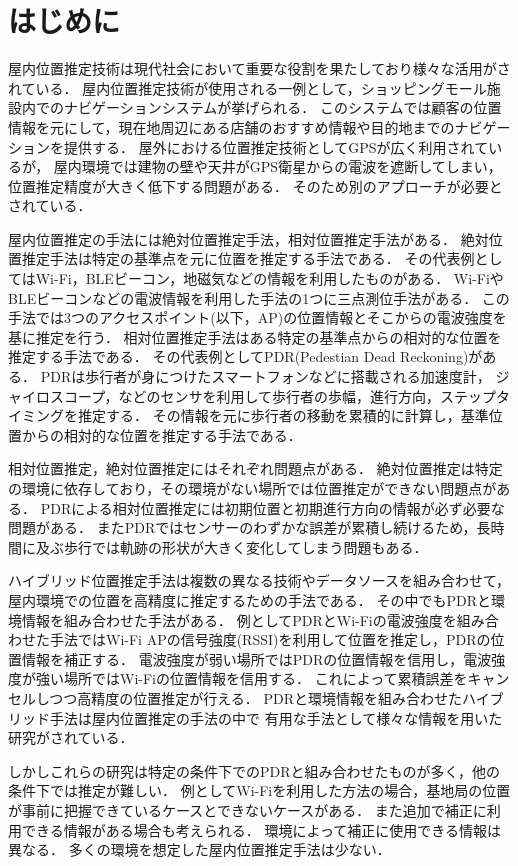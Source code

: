 
\section{はじめに}
屋内位置推定技術は現代社会において重要な役割を果たしており様々な活用がされている．
屋内位置推定技術が使用される一例として，ショッピングモール施設内でのナビゲーションシステムが挙げられる\cite{burasapo}．
このシステムでは顧客の位置情報を元にして，現在地周辺にある店舗のおすすめ情報や目的地までのナビゲーションを提供する．
屋外における位置推定技術としてGPSが広く利用されているが，
屋内環境では建物の壁や天井がGPS衛星からの電波を遮断してしまい，
位置推定精度が大きく低下する問題がある．
そのため別のアプローチが必要とされている．

屋内位置推定の手法には絶対位置推定手法，相対位置推定手法がある．
絶対位置推定手法は特定の基準点を元に位置を推定する手法である．
その代表例としてはWi-Fi，BLEビーコン，地磁気などの情報を利用したものがある．
Wi-FiやBLEビーコンなどの電波情報を利用した手法の1つに三点測位手法がある．
この手法では3つのアクセスポイント(以下，AP)の位置情報とそこからの電波強度を基に推定を行う．
相対位置推定手法はある特定の基準点からの相対的な位置を推定する手法である．
その代表例としてPDR(Pedestian Dead Reckoning)がある．
PDRは歩行者が身につけたスマートフォンなどに搭載される加速度計，
ジャイロスコープ，などのセンサを利用して歩行者の歩幅，進行方向，ステップタイミングを推定する．
その情報を元に歩行者の移動を累積的に計算し，基準位置からの相対的な位置を推定する手法である．

相対位置推定，絶対位置推定にはそれぞれ問題点がある．
絶対位置推定は特定の環境に依存しており，その環境がない場所では位置推定ができない問題点がある．
PDRによる相対位置推定には初期位置と初期進行方向の情報が必ず必要な問題がある．
またPDRではセンサーのわずかな誤差が累積し続けるため，長時間に及ぶ歩行では軌跡の形状が大きく変化してしまう問題もある．

ハイブリッド位置推定手法は複数の異なる技術やデータソースを組み合わせて，
屋内環境での位置を高精度に推定するための手法である．
その中でもPDRと環境情報を組み合わせた手法がある．
例としてPDRとWi-Fiの電波強度を組み合わせた手法ではWi-Fi APの信号強度(RSSI)を利用して位置を推定し，PDRの位置情報を補正する．
電波強度が弱い場所ではPDRの位置情報を信用し，電波強度が強い場所ではWi-Fiの位置情報を信用する．
これによって累積誤差をキャンセルしつつ高精度の位置推定が行える．
PDRと環境情報を組み合わせたハイブリッド手法は屋内位置推定の手法の中で
有用な手法として様々な情報を用いた研究がされている．

しかしこれらの研究は特定の条件下でのPDRと組み合わせたものが多く，他の条件下では推定が難しい．
例としてWi-Fiを利用した方法の場合，基地局の位置が事前に把握できているケースとできないケースがある．
また追加で補正に利用できる情報がある場合も考えられる．
環境によって補正に使用できる情報は異なる．
多くの環境を想定した屋内位置推定手法は少ない．

